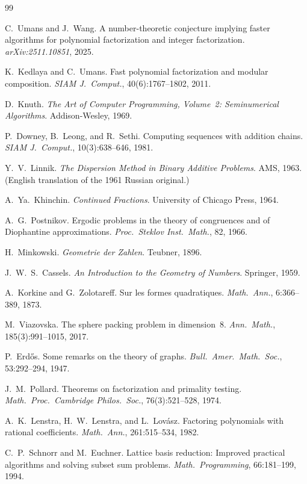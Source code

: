 \documentclass[12pt]{article}
\theoremstyle{remark}
\begin{document}

\begin{thebibliography}{99}

C.~Umans and J.~Wang.
\newblock A number-theoretic conjecture implying faster algorithms for
  polynomial factorization and integer factorization.
\newblock \emph{arXiv:2511.10851}, 2025.

K.~Kedlaya and C.~Umans.
\newblock Fast polynomial factorization and modular composition.
\newblock \emph{SIAM J.\ Comput.}, 40(6):1767--1802, 2011.

D.~Knuth.
\newblock \emph{The Art of Computer Programming, Volume~2: Seminumerical
  Algorithms}.
\newblock Addison-Wesley, 1969.

P.~Downey, B.~Leong, and R.~Sethi.
\newblock Computing sequences with addition chains.
\newblock \emph{SIAM J.\ Comput.}, 10(3):638--646, 1981.

Y.~V.~Linnik.
\newblock \emph{The Dispersion Method in Binary Additive Problems}.
\newblock AMS, 1963.
\newblock (English translation of the 1961 Russian original.)

A.~Ya.~Khinchin.
\newblock \emph{Continued Fractions}.
\newblock University of Chicago Press, 1964.

A.~G.~Postnikov.
\newblock Ergodic problems in the theory of congruences and of Diophantine
  approximations.
\newblock \emph{Proc.\ Steklov Inst.\ Math.}, 82, 1966.

H.~Minkowski.
\newblock \emph{Geometrie der Zahlen}.
\newblock Teubner, 1896.

J.~W.~S.~Cassels.
\newblock \emph{An Introduction to the Geometry of Numbers}.
\newblock Springer, 1959.

A.~Korkine and G.~Zolotareff.
\newblock Sur les formes quadratiques.
\newblock \emph{Math.\ Ann.}, 6:366--389, 1873.

M.~Viazovska.
\newblock The sphere packing problem in dimension~8.
\newblock \emph{Ann.\ Math.}, 185(3):991--1015, 2017.

P.~Erd\H{o}s.
\newblock Some remarks on the theory of graphs.
\newblock \emph{Bull.\ Amer.\ Math.\ Soc.}, 53:292--294, 1947.

J.~M.~Pollard.
\newblock Theorems on factorization and primality testing.
\newblock \emph{Math.\ Proc.\ Cambridge Philos.\ Soc.}, 76(3):521--528, 1974.

A.~K.~Lenstra, H.~W.~Lenstra, and L.~Lov\'asz.
\newblock Factoring polynomials with rational coefficients.
\newblock \emph{Math.\ Ann.}, 261:515--534, 1982.

C.~P.~Schnorr and M.~Euchner.
\newblock Lattice basis reduction: Improved practical algorithms and solving
  subset sum problems.
\newblock \emph{Math.\ Programming}, 66:181--199, 1994.

\end{thebibliography}
\end{document}
